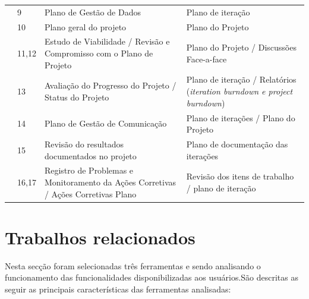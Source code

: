 \documentclass{acm_proc_article-sp}
\begin{document}
\begin{table}[h]
\begin{tabular}{|p{20mm}|p{10mm}|p{60mm}|p{60mm}|}
& 9 & Plano de Gestão de Dados & Plano de iteração \\
& 10 & Plano geral do projeto & Plano do Projeto \\
& 11,12 & Estudo de Viabilidade / Revisão e Compromisso com o Plano de Projeto & Plano do Projeto / Discussões Face-a-face \\
& 13 & Avaliação do Progresso do Projeto / Status do Projeto & Plano de iteração / Relatórios (\textit{iteration burndown
e project burndown})\\
& 14 & Plano de Gestão de Comunicação & Plano de iterações / Plano do Projeto \\
& 15 & Revisão do resultados documentados no projeto & Plano de documentação das iterações \\
& 16,17 & Registro de Problemas e Monitoramento da Ações Corretivas / Ações Corretivas Plano & Revisão dos itens de trabalho / plano de iteração \\

\hline
\end{tabular}
\end{table}

\section{Trabalhos relacionados}
Nesta secção foram selecionadas três ferramentas e sendo analisando o funcionamento das funcionalidades disponibilizadas aos usuários.São descritas as seguir as principais características das ferramentas analisadas:
\end{document}
